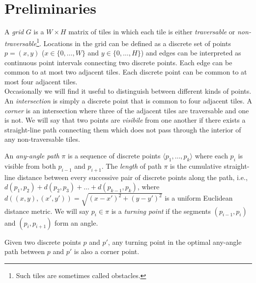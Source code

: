 \section{Preliminaries}
A \emph{grid} $G$ is a $W \times H$ matrix of tiles in which each tile is either
\emph{traversable} or \emph{non-traversable}\footnote{Such tiles are sometimes
called obstacles.}.
Locations in the grid can be defined as a discrete set of points $p = (x, y)$
($x \in \{0,\dots,W\}$ and $y \in \{0,\dots,H\}$)
and edges can be interpreted as continuous point intervals connecting two discrete points.
Each edge can be common to at most two adjacent tiles. Each discrete point can be common
to at most four adjacent tiles.
\\
Occasionally we will find it useful to distinguish between different kinds of points.
An \emph{intersection} is simply a discrete point that is common to four adjacent tiles.
A \emph{corner} is an intersection where three of the adjacent tiles are traversable
and one is not.
We will say that two points are \emph{visibile} from one another if there exists a 
straight-line path connecting them which does not pass through the interior of any
 non-traversable tiles.


An \emph{any-angle path} $\pi$ is a sequence of discrete points 
$\langle p_1,\dots,p_k \rangle$ where each $p_{i}$ is visible from both $p_{i-1}$
and $p_{i+1}$.
The \emph{length} of path $\pi$ 
is the cumulative straight-line distance between every successive
pair of discrete points along the path, 
i.e., $d(p_1,p_2) + d(p_2,p_3) + \dots + d(p_{k-1},p_k)$, 
where $d((x,y), (x',y'))= \sqrt{(x-x')^2 + (y-y')^2}$ 
is a uniform Euclidean distance metric.
We will say $p_i \in \pi$ is a \emph{turning point} if the segments
$(p_{i-1}, p_i)$ and $(p_i, p_{i+1})$ form an angle.
\\
\begin{lemm}
\label{lemma::corner}
  Given two discrete points $p$ and $p'$, 
  any turning point in the optimal any-angle path between $p$ and $p'$ 
  is also a corner point.
\end{lemm}

